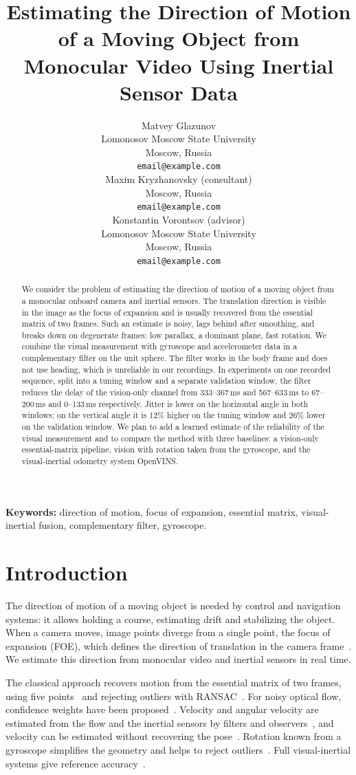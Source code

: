 \documentclass{article}
\title{Estimating the Direction of Motion of a Moving Object from Monocular Video Using Inertial Sensor Data}
\author{
  Matvey Glazunov\\
  Lomonosov Moscow State University\\
  Moscow, Russia\\
  \texttt{email@example.com}\\
  \And
  Maxim Kryzhanovsky (consultant)\\
  Moscow, Russia\\
  \texttt{email@example.com}\\
  \And
  Konstantin Vorontsov (advisor)\\
  Lomonosov Moscow State University\\
  Moscow, Russia\\
  \texttt{email@example.com}\\
}
\begin{document}
\maketitle

\begin{abstract}
    We consider the problem of estimating the direction of motion of a moving object from a monocular onboard camera and inertial sensors. The translation direction is visible in the image as the focus of expansion and is usually recovered from the essential matrix of two frames. Such an estimate is noisy, lags behind after smoothing, and breaks down on degenerate frames: low parallax, a dominant plane, fast rotation. We combine the visual measurement with gyroscope and accelerometer data in a complementary filter on the unit sphere. The filter works in the body frame and does not use heading, which is unreliable in our recordings. In experiments on one recorded sequence, split into a tuning window and a separate validation window, the filter reduces the delay of the vision-only channel from 333--367\,ms and 567--633\,ms to 67--200\,ms and 0--133\,ms respectively. Jitter is lower on the horizontal angle in both windows; on the vertical angle it is 12\% higher on the tuning window and 26\% lower on the validation window. We plan to add a learned estimate of the reliability of the visual measurement and to compare the method with three baselines: a vision-only essential-matrix pipeline, vision with rotation taken from the gyroscope, and the visual-inertial odometry system OpenVINS.
\end{abstract}

\textbf{Keywords:} direction of motion, focus of expansion, essential matrix, visual-inertial fusion, complementary filter, gyroscope.

\section{Introduction}\label{sec:intro}

The direction of motion of a moving object is needed by control and navigation systems: it allows holding a course, estimating drift and stabilizing the object. When a camera moves, image points diverge from a single point, the focus of expansion (FOE), which defines the direction of translation in the camera frame~\citep{longuet1980interpretation}. We estimate this direction from monocular video and inertial sensors in real time.

The classical approach recovers motion from the essential matrix of two frames, using five points~\citep{nister2004five} and rejecting outliers with RANSAC~\citep{fischler1981ransac}. For noisy optical flow, confidence weights have been proposed~\citep{jaegle2016egomotion}. Velocity and angular velocity are estimated from the flow and the inertial sensors by filters and observers~\citep{grabe2015nonlinear, zhong2020direct}, and velocity can be estimated without recovering the pose~\citep{xu2024tight}. Rotation known from a gyroscope simplifies the geometry and helps to reject outliers~\citep{kneip2011robust, troiani2014twopoint}. Full visual-inertial systems give reference accuracy~\citep{geneva2020openvins}.
\end{document}
